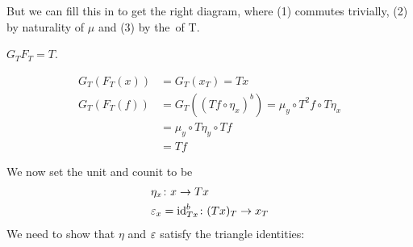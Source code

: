 \begin{beweis}
\begin{itemize1}
\begin{figure}[H]
\begin{subfigure}{0.45\textwidth}
    \end{subfigure}
    \hspace{2em}
    \begin{subfigure}{0.45\textwidth}
    \centering
    \end{subfigure}
    \end{figure}
    But we can fill this in to get the right diagram,
    where (1) commutes trivially, (2) by naturality of $\mu$ and (3) by the~ of T.
    \newpage
    \begin{claim*}
        $G_T F_T =T$.
    \end{claim*}
    \begin{smallproof}
    \begin{align*}
        G_T(F_T(x)) &= G_T(x_T) = Tx \\
        G_T(F_T(f)) &= G_T((Tf \circ \eta_x)^b) = \mu_y \circ T^2f \circ T\eta_x \\
        &= \mu_y \circ T\eta_y \circ Tf \tag{naturality of $\eta$}\\
        &= Tf \tag{\refunitality of $T$}
    \end{align*}
    \end{smallproof}
    \item We now set the unit and counit to be 
    \begin{align*}
        &\eta_x \colon x \to Tx\\
        &\varepsilon_x = \operatorname{id}_{Tx}^b \colon (Tx)_T \to x_T
    \end{align*}
    We need to show that $\eta$ and $\varepsilon$ satisfy the triangle identities:
    \begin{figure}[H]
    \centering
    \begin{subfigure}{0.4\textwidth}

\end{subfigure}
\end{figure}
\end{itemize1}
\end{beweis}
